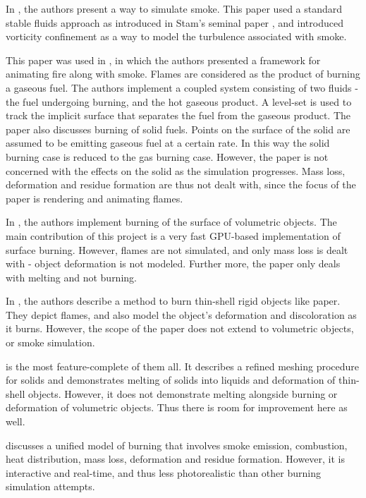\documentclass[a4paper]{report}
\begin{document}
In \cite{festje}, the authors present a way to simulate smoke. This paper used a standard stable fluids approach as introduced in Stam's seminal paper \cite{stam}, and introduced vorticity confinement as a way to model the turbulence associated with smoke.

This paper was used in \cite{ngfeje}, in which the authors presented a framework for animating fire along with smoke. Flames are considered as the product of burning a gaseous fuel. The authors implement a coupled system consisting of two fluids - the fuel undergoing burning, and the hot gaseous product. A level-set is used to track the implicit surface that separates the fuel from the gaseous product. The paper also discusses burning of solid fuels. Points on the surface of the solid are assumed to be emitting gaseous fuel at a certain rate. In this way the solid burning case is reduced to the gas burning case. However, the paper is not concerned with the effects on the solid as the simulation progresses. Mass loss, deformation and residue formation are thus not dealt with, since the focus of the paper is rendering and animating flames.

In \cite{jiyoai}, the authors implement burning of the surface of volumetric objects. The main contribution of this project is a very fast GPU-based implementation of surface burning. However, flames are not simulated, and only mass loss is dealt with - object deformation is not modeled. Further more, the paper only deals with melting and not burning.

In \cite{liliansu}, the authors describe a method to burn thin-shell rigid objects like paper. They depict flames, and also model the object's deformation and discoloration as it burns. However, the scope of the paper does not extend to volumetric objects, or smoke simulation.

\cite{loirgufe} is the most feature-complete of them all. It describes a refined meshing procedure for solids and demonstrates melting of solids into liquids and deformation of thin-shell objects. However, it does not demonstrate melting alongside burning or deformation of volumetric objects. Thus there is room for improvement here as well.

\cite{melek} discusses a unified model of burning that involves smoke emission, combustion, heat distribution, mass loss, deformation and residue formation. However, it is interactive and real-time, and thus less photorealistic than other burning simulation attempts.

\end{document}
